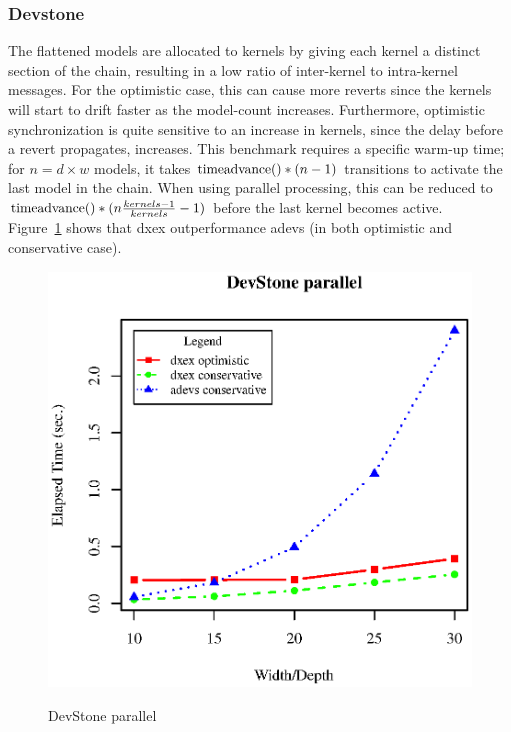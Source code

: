 \subsubsection{Devstone}
The flattened models are allocated to kernels by giving each kernel a distinct section of the chain, resulting in a low ratio of inter-kernel to intra-kernel messages. For the optimistic case, this can cause more reverts since the kernels will start to drift faster as the model-count increases. Furthermore, optimistic synchronization is quite sensitive to an increase in kernels, since the delay before a revert propagates, increases. This benchmark requires a specific warm-up time; for $n=d\times w$ models, it takes $\textup{timeadvance}()*(n-1)$ transitions to activate the last model in the chain. When using parallel processing, this can be reduced to $\textup{timeadvance}()*(n\frac{kernels-1}{kernels} -1)$ before the last kernel becomes active.\\
Figure~\ref{fig:DevstoneParallel} shows that dxex outperformance adevs (in both optimistic and conservative case).
\begin{figure}
	\includegraphics[width=.5\textwidth]{fig/fig2.eps}
	\label{fig:DevstoneParallel}
	\caption{DevStone parallel}
\end{figure}
